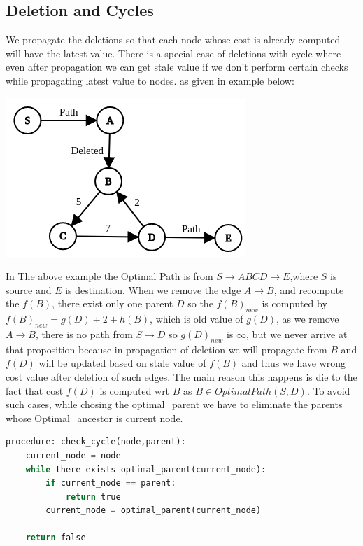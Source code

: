\documentclass[a4paper]{article}
\begin{document}
\subsection{Deletion and Cycles}
We propagate the deletions so that each node whose cost is already computed will have the latest value. There is a special case of deletions with cycle where even after propagation we can get stale value if we don't perform  certain checks while propagating latest value to nodes. as given in example below:
\begin{center}
\includegraphics[scale=0.45]{img/cycle.png}        
\end{center}
In The above example the Optimal Path is from $S \rightarrow ABCD \rightarrow E$,where $S$ is source and $E$ is destination. When we remove the edge $A \rightarrow B$, and recompute the $f(B)$, there exist only one parent $D$ so the $f(B)_{new}$ is computed by $f(B)_{new} = g(D) + 2 + h(B)$, which is old value of $g(D)$, as we remove $A \rightarrow B$, there is no path from $S \rightarrow D$ so $g(D)_{new}$ is $\infty$, but we never arrive at that proposition because in propagation of deletion we will propagate from $B$  and $f(D)$ will be updated based on stale value of $f(B)$ and thus we have wrong cost value after deletion of such edges. The main reason this happens is die to the fact that cost $f(D)$ is computed wrt $B$ as $B \in OptimalPath(S,D)$. To avoid such cases, while chosing the optimal\_parent we have to eliminate the parents whose Optimal\_ancestor is current node.\\
\begin{lstlisting}[language=python, caption=Check Cycles]
procedure: check_cycle(node,parent):
    current_node = node
    while there exists optimal_parent(current_node):
        if current_node == parent:
            return true
        current_node = optimal_parent(current_node)
    
    return false
\end{lstlisting}
\end{document}
